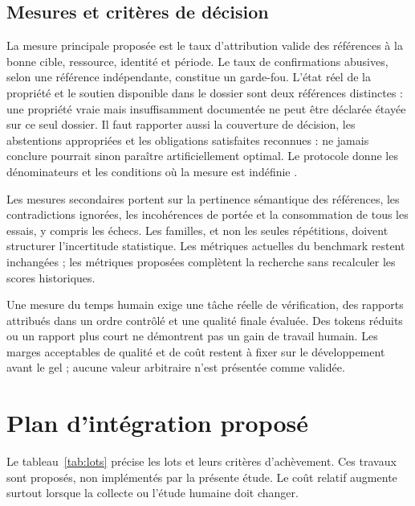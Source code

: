 \documentclass[11pt,a4paper]{article}
\begin{document}
\subsection{Mesures et critères de décision}
La mesure principale proposée est le taux d'attribution valide des références
à la bonne cible, ressource, identité et période. Le taux de confirmations
abusives, selon une référence indépendante, constitue un garde-fou.
L'état réel de la propriété et le soutien disponible dans le dossier sont deux
références distinctes : une propriété vraie mais insuffisamment documentée
ne peut être déclarée étayée sur ce seul dossier.
Il faut rapporter aussi la couverture de décision, les abstentions appropriées
et les obligations satisfaites reconnues : ne jamais conclure pourrait sinon
paraître artificiellement optimal. Le protocole donne les dénominateurs et
les conditions où la mesure est indéfinie \cite{protocole}.

Les mesures secondaires portent sur la pertinence sémantique des références,
les contradictions ignorées, les incohérences de portée et la consommation
de tous les essais, y compris les échecs. Les familles, et non les seules
répétitions, doivent structurer l'incertitude statistique. Les métriques
actuelles du benchmark restent inchangées ; les métriques proposées
complètent la recherche sans recalculer les scores historiques.

Une mesure du temps humain exige une tâche réelle de vérification, des rapports
attribués dans un ordre contrôlé et une qualité finale évaluée. Des tokens
réduits ou un rapport plus court ne démontrent pas un gain de travail humain.
Les marges acceptables de qualité et de coût restent à fixer sur le
développement avant le gel ; aucune valeur arbitraire n'est présentée comme
validée.

\section{Plan d'intégration proposé}
Le tableau~\ref{tab:lots} précise les lots et leurs critères d'achèvement.
Ces travaux sont proposés, non implémentés par la présente étude. Le coût
relatif augmente surtout lorsque la collecte ou l'étude humaine doit changer.
\end{document}
